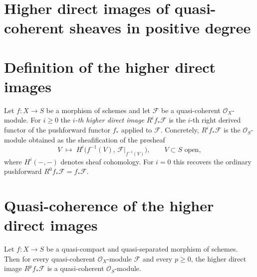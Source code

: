 \section{Higher direct images of quasi-coherent sheaves in positive degree}
\label{mk-chap:Cohomology_HigherDirectImage}

\section{Definition of the higher direct images}

\begin{definition}\label{mk-def:higher_direct_image}
  \leanok

  Let \(f : X \to S\) be a morphism of schemes and let \(\mathcal{F}\) be a
  quasi-coherent \(\mathcal{O}_X\)-module. For \(i \geq 0\) the \emph{\(i\)-th
  higher direct image} \(R^i f_*\mathcal{F}\) is the \(i\)-th right derived functor
  of the pushforward functor \(f_*\) applied to \(\mathcal{F}\). Concretely,
  \(R^i f_*\mathcal{F}\) is the \(\mathcal{O}_S\)-module obtained as the
  sheafification of the presheaf
  \[
    V \;\longmapsto\; H^i\bigl(f^{-1}(V),\, \mathcal{F}|_{f^{-1}(V)}\bigr),
    \qquad V \subset S \text{ open},
  \]
  where \(H^i(-, -)\) denotes sheaf cohomology. For \(i = 0\) this recovers the
  ordinary pushforward \(R^0 f_*\mathcal{F} = f_*\mathcal{F}\).
\end{definition}

\section{Quasi-coherence of the higher direct images}

\begin{lemma}
  \label{mk-lem:higher_direct_image_quasi_coherent}
  Let \(f : X \to S\) be a quasi-compact and quasi-separated morphism of schemes.
  Then for every quasi-coherent \(\mathcal{O}_X\)-module \(\mathcal{F}\) and every
  \(p \geq 0\), the higher direct image \(R^p f_*\mathcal{F}\) is a quasi-coherent
  \(\mathcal{O}_S\)-module.
\end{lemma}

